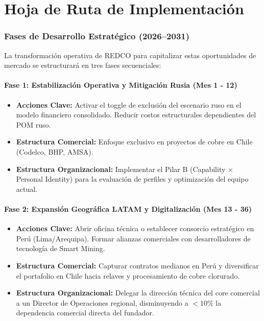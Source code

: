 \chapter{Hoja de Ruta de Implementación}

\subsection{Fases de Desarrollo Estratégico (2026--2031)}
La transformación operativa de REDCO para capitalizar estas oportunidades de mercado se estructurará en tres fases secuenciales:

\subsubsection{Fase 1: Estabilización Operativa y Mitigación Rusia (Mes 1 - 12)}
\begin{itemize}
    \item \textbf{Acciones Clave:} Activar el toggle de exclusión del escenario ruso en el modelo financiero consolidado. Reducir costos estructurales dependientes del POM ruso.
    \item \textbf{Estructura Comercial:} Enfoque exclusivo en proyectos de cobre en Chile (Codelco, BHP, AMSA).
    \item \textbf{Estructura Organizacional:} Implementar el Pilar B (Capability × Personal Identity) para la evaluación de perfiles y optimización del equipo actual.
\end{itemize}

\subsubsection{Fase 2: Expansión Geográfica LATAM y Digitalización (Mes 13 - 36)}
\begin{itemize}
    \item \textbf{Acciones Clave:} Abrir oficina técnica o establecer consorcio estratégico en Perú (Lima/Arequipa). Formar alianzas comerciales con desarrolladores de tecnología de Smart Mining.
    \item \textbf{Estructura Comercial:} Capturar contratos medianos en Perú y diversificar el portafolio en Chile hacia relaves y procesamiento de cobre clorurado.
    \item \textbf{Estructura Organizacional:} Delegar la dirección técnica del core comercial a un Director de Operaciones regional, disminuyendo a $<10\%$ la dependencia comercial directa del fundador.
\end{itemize}

